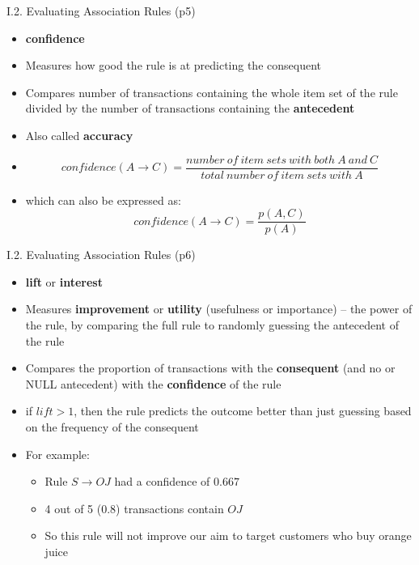 \documentclass[handout]{beamer}
\newcommand{\strong}[1]{\textbf{\color{teal} #1}}
\newcommand{\stronger}[1]{\textbf{\color{purple} #1}}
\begin{document}
\begin{frame}{I.2. Evaluating Association Rules (p5)}
\begin{itemize}
\item[] \stronger{confidence}
\item Measures how good the rule is at predicting the consequent
\item Compares number of transactions containing the whole item set of the rule divided by the number of transactions containing the \strong{antecedent}
\item Also called \stronger{accuracy}
\item[]
\[
	confidence( A \rightarrow C ) = 
	\frac{ \mathit{ number~of~item~sets~with~both~A~and~C }}
	     { \mathit{ total~number~of~item~sets~with~A }}
\]
\item[] which can also be expressed as:
\[
	confidence( A \rightarrow C ) = 
	\frac{ p(A,C) }{ p(A) }
\]
\end{itemize}
\end{frame}
\begin{frame}{I.2. Evaluating Association Rules (p6)}
\begin{itemize}
\item \stronger{lift} or \stronger{interest}
\item Measures \strong{improvement} or \strong{utility} (usefulness or importance) -- the power of the rule, by comparing the full rule to randomly guessing the antecedent of the rule
\item Compares the proportion of transactions with the \strong{consequent} (and no or NULL antecedent) with the \strong{confidence} of the rule
\item if $lift > 1$, then the rule predicts the outcome better than just guessing based on the frequency of the consequent
\item For example:
	\begin{itemize}
	\item Rule $S \rightarrow OJ$ had a confidence of $0.667$
	\item 4 out of 5 ($0.8$) transactions contain $OJ$
	\item So this rule will not improve our aim to target customers who buy orange juice 
	\end{itemize}
\end{itemize}
\end{frame}
\end{document}
